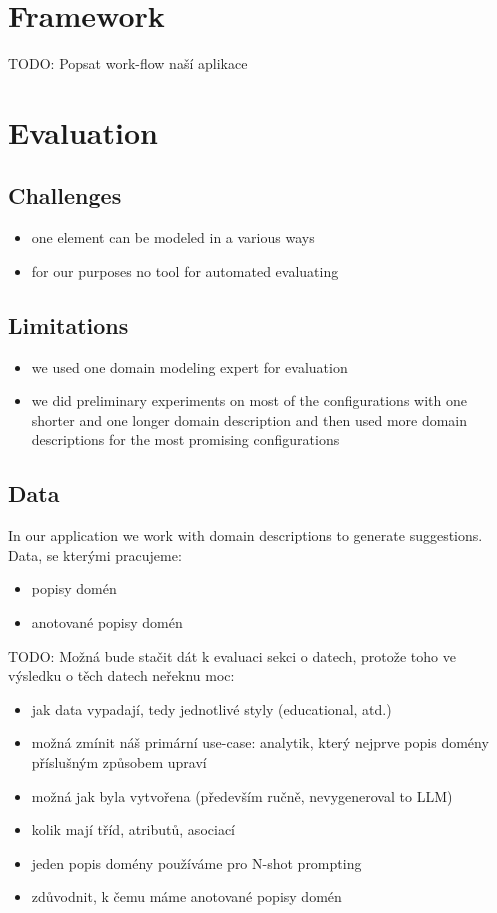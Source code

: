 \chapter{Framework}
TODO: Popsat work-flow naší aplikace


\chapter{Evaluation}

\section{Challenges}
\begin{itemize}
\item one element can be modeled in a various ways
\item for our purposes no tool for automated evaluating
\end{itemize}


\section{Limitations}
\begin{itemize}
\item we used one domain modeling expert for evaluation
\item we did preliminary experiments on most of the configurations with one shorter and one longer domain description and then used more domain descriptions for the most promising configurations
\end{itemize}


\section{Data}

In our application we work with domain descriptions to generate suggestions. \\

Data, se kterými pracujeme:
\begin{itemize}
\item popisy domén
\item anotované popisy domén
\end{itemize}


TODO: Možná bude stačit dát k evaluaci sekci o datech, protože toho ve výsledku o těch datech neřeknu moc:
\begin{itemize}
\item jak data vypadají, tedy jednotlivé styly (educational, atd.)
\item možná zmínit náš primární use-case: analytik, který nejprve popis domény příslušným způsobem upraví
\item možná jak byla vytvořena (především ručně, nevygeneroval to LLM)
\item kolik mají tříd, atributů, asociací
\item jeden popis domény používáme pro N-shot prompting
\item zdůvodnit, k čemu máme anotované popisy domén
\end{itemize}



